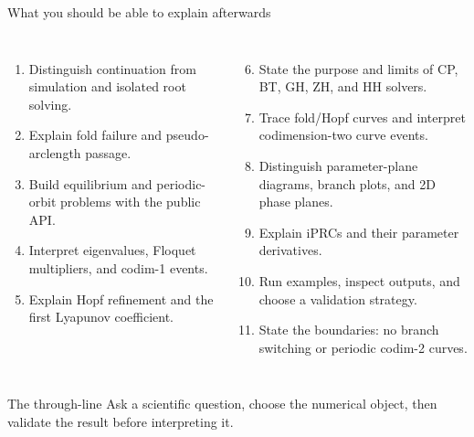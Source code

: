 \begin{frame}{What you should be able to explain afterwards}
\footnotesize
\begin{columns}[T,onlytextwidth]
\begin{enumerate}
  \item Distinguish continuation from simulation and isolated root solving.
  \item Explain fold failure and pseudo-arclength passage.
  \item Build equilibrium and periodic-orbit problems with the public API.
  \item Interpret eigenvalues, Floquet multipliers, and codim-1 events.
  \item Explain Hopf refinement and the first Lyapunov coefficient.
\end{enumerate}

\begin{enumerate}
  \setcounter{enumi}{5}
  \item State the purpose and limits of CP, BT, GH, ZH, and HH solvers.
  \item Trace fold/Hopf curves and interpret codimension-two curve events.
  \item Distinguish parameter-plane diagrams, branch plots, and 2D phase planes.
  \item Explain iPRCs and their parameter derivatives.
  \item Run examples, inspect outputs, and choose a validation strategy.
  \item State the boundaries: no branch switching or periodic codim-2 curves.
\end{enumerate}
\end{columns}

\vfill
\begin{block}{The through-line}
Ask a scientific question, choose the numerical object, then validate the
result before interpreting it.
\end{block}
\end{frame}

